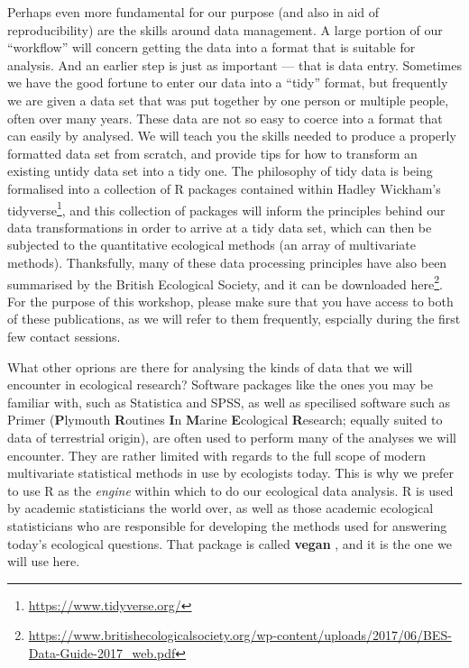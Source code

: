 \documentclass[english,10pt,a4paper,oneside]{book}
\renewcommand{\href}[2]{#2\footnote{\url{#1}}}
\let\rmarkdownfootnote\footnote%
\def\footnote{\protect\rmarkdownfootnote}
\renewcommand\texttt[1]{{\ttfamily\color{ttcolor}#1}}
\theoremstyle{definition}
\theoremstyle{definition}
\theoremstyle{definition}
\theoremstyle{remark}
\begin{document}
Perhaps even more fundamental for our purpose (and also in aid of
reproducibility) are the skills around data management. A large portion
of our \enquote{workflow} will concern getting the data into a format
that is suitable for analysis. And an earlier step is just as important
--- that is data entry. Sometimes we have the good fortune to enter our
data into a \enquote{tidy} format, but frequently we are given a data
set that was put together by one person or multiple people, often over
many years. These data are not so easy to coerce into a format that can
easily by analysed. We will teach you the skills needed to produce a
properly formatted data set from scratch, and provide tips for how to
transform an existing untidy data set into a tidy one. The philosophy of
tidy data is being formalised into a collection of R packages contained
within Hadley Wickham's
\href{https://www.tidyverse.org/}{\texttt{tidyverse}}, and this
collection of packages will inform the principles behind our data
transformations in order to arrive at a tidy data set, which can then be
subjected to the quantitative ecological methods (an array of
multivariate methods). Thanksfully, many of these data processing
principles have also been summarised by the British Ecological Society,
and it can be downloaded
\href{https://www.britishecologicalsociety.org/wp-content/uploads/2017/06/BES-Data-Guide-2017_web.pdf}{here}.
For the purpose of this workshop, please make sure that you have access
to both of these publications, as we will refer to them frequently,
espcially during the first few contact sessions.

What other oprions are there for analysing the kinds of data that we
will encounter in ecological research? Software packages like the ones
you may be familiar with, such as Statistica and SPSS, as well as
specilised software such as Primer (\textbf{P}lymouth \textbf{R}outines
\textbf{I}n \textbf{M}arine \textbf{E}cological \textbf{R}esearch;
equally suited to data of terrestrial origin), are often used to perform
many of the analyses we will encounter. They are rather limited with
regards to the full scope of modern multivariate statistical methods in
use by ecologists today. This is why we prefer to use R as the
\emph{engine} within which to do our ecological data analysis. R is used
by academic statisticians the world over, as well as those academic
ecological statisticians who are responsible for developing the methods
used for answering today's ecological questions. That package is called
\textbf{\texttt{vegan}} \citep{vegan2017}, and it is the one we will use
here.
\end{document}
